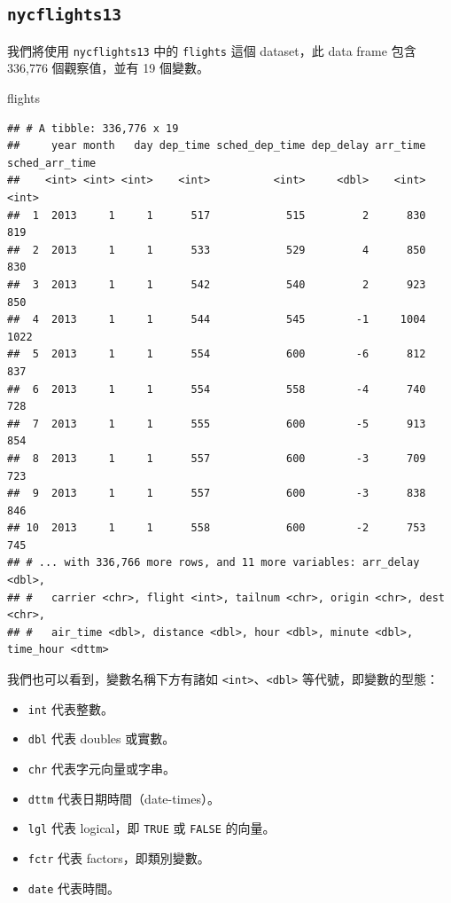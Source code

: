 \documentclass[
]{book}
\newenvironment{Shaded}{\begin{snugshade}}{\end{snugshade}}
\newcommand{\NormalTok}[1]{#1}
\theoremstyle{definition}
\theoremstyle{remark}
\begin{document}
\hypertarget{nycflights13}{%
\subsection{\texorpdfstring{\texttt{nycflights13}}{nycflights13}}\label{nycflights13}}

我們將使用 \texttt{nycflights13} 中的 \texttt{flights} 這個 dataset，此 data frame 包含 336,776 個觀察值，並有 19 個變數。

\begin{Shaded}
\begin{Highlighting}[]
\NormalTok{flights}
\end{Highlighting}
\end{Shaded}

\begin{verbatim}
## # A tibble: 336,776 x 19
##     year month   day dep_time sched_dep_time dep_delay arr_time sched_arr_time
##    <int> <int> <int>    <int>          <int>     <dbl>    <int>          <int>
##  1  2013     1     1      517            515         2      830            819
##  2  2013     1     1      533            529         4      850            830
##  3  2013     1     1      542            540         2      923            850
##  4  2013     1     1      544            545        -1     1004           1022
##  5  2013     1     1      554            600        -6      812            837
##  6  2013     1     1      554            558        -4      740            728
##  7  2013     1     1      555            600        -5      913            854
##  8  2013     1     1      557            600        -3      709            723
##  9  2013     1     1      557            600        -3      838            846
## 10  2013     1     1      558            600        -2      753            745
## # ... with 336,766 more rows, and 11 more variables: arr_delay <dbl>,
## #   carrier <chr>, flight <int>, tailnum <chr>, origin <chr>, dest <chr>,
## #   air_time <dbl>, distance <dbl>, hour <dbl>, minute <dbl>, time_hour <dttm>
\end{verbatim}

我們也可以看到，變數名稱下方有諸如 \texttt{\textless{}int\textgreater{}}、\texttt{\textless{}dbl\textgreater{}} 等代號，即變數的型態：

\begin{itemize}
\item
  \texttt{int} 代表整數。
\item
  \texttt{dbl} 代表 doubles 或實數。
\item
  \texttt{chr} 代表字元向量或字串。
\item
  \texttt{dttm} 代表日期時間（date-times）。
\item
  \texttt{lgl} 代表 logical，即 \texttt{TRUE} 或 \texttt{FALSE} 的向量。
\item
  \texttt{fctr} 代表 factors，即類別變數。
\item
  \texttt{date} 代表時間。
\end{itemize}
\end{document}
